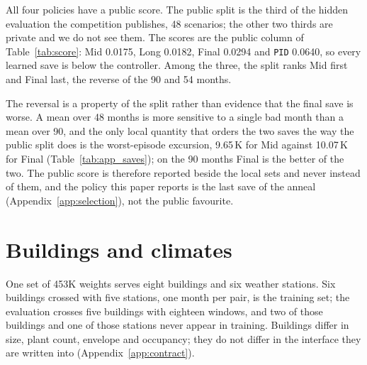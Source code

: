 \documentclass{article}
\begin{document}
All four policies have a public score. The public split is the third of the hidden evaluation the competition publishes, 48 scenarios; the other two thirds are private and we do not see them. The scores are the public column of Table~\ref{tab:score}: Mid 0.0175, Long 0.0182, Final 0.0294 and \texttt{PID} 0.0640, so every learned save is below the controller. Among the three, the split ranks Mid first and Final last, the reverse of the 90 and 54 months.

The reversal is a property of the split rather than evidence that the final save is worse. A mean over 48 months is more sensitive to a single bad month than a mean over 90, and the only local quantity that orders the two saves the way the public split does is the worst-episode excursion, 9.65\,K for Mid against 10.07\,K for Final (Table~\ref{tab:app_saves}); on the 90 months Final is the better of the two. The public score is therefore reported beside the local sets and never instead of them, and the policy this paper reports is the last save of the anneal (Appendix~\ref{app:selection}), not the public favourite.

\section{Buildings and climates}
\label{app:buildings}

One set of 453K weights serves eight buildings and six weather stations. Six buildings crossed with five stations, one month per pair, is the training set; the evaluation crosses five buildings with eighteen windows, and two of those buildings and one of those stations never appear in training. Buildings differ in size, plant count, envelope and occupancy; they do not differ in the interface they are written into (Appendix~\ref{app:contract}).
\end{document}
